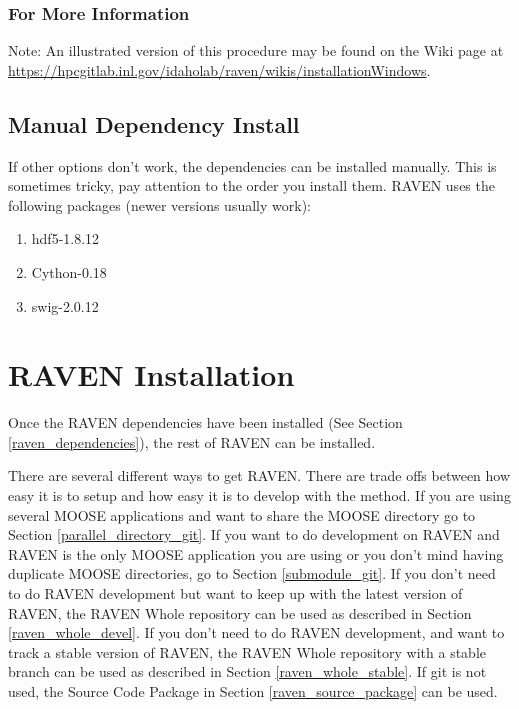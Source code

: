 \subsubsection{For More Information}
Note: An illustrated version of this procedure may be found on the Wiki page at 
\url{https://hpcgitlab.inl.gov/idaholab/raven/wikis/installationWindows}.

\subsection{Manual Dependency Install}
\label{sysprep_manual}

If other options don't work, the dependencies can be installed
manually.  This is sometimes tricky, pay attention to the order you
install them.  RAVEN uses the following packages (newer versions
usually work):

\begin{enumerate}
  
\item hdf5-1.8.12
\item Cython-0.18
\item swig-2.0.12
\end{enumerate}

\goToRavenInstallation

\section{RAVEN Installation}
\label{raven_installation}

Once the RAVEN dependencies have been installed (See Section
\ref{raven_dependencies}), the rest of RAVEN can be installed.

There are several different ways to get RAVEN.  There are trade offs
between how easy it is to setup and how easy it is to develop with the
method.  If you are using several MOOSE applications and want to share
the MOOSE directory go to Section \ref{parallel_directory_git}.  If
you want to do development on RAVEN and RAVEN is the only MOOSE
application you are using or you don't mind having duplicate MOOSE
directories, go to Section \ref{submodule_git}.  If you don't need to
do RAVEN development but want to keep up with the latest version of
RAVEN, the RAVEN Whole repository can be used as described in Section
\ref{raven_whole_devel}.  If you don't need to do RAVEN development,
and want to track a stable version of RAVEN, the RAVEN Whole
repository with a stable branch can be used as described in Section
\ref{raven_whole_stable}.  If git is not used, the Source Code
Package in Section \ref{raven_source_package} can be used.

